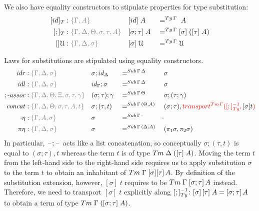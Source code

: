 \documentclass[a4paper,UKenglish,numberwithinsect,cleveref,thm-restate]{lipics-v2021}
\begin{document}
We also have equality constructors to stipulate properties for type substitution:
\begin{alignat*}{3}
  [\idS]_T & : \implicit{\Gamma, A}                               && [ \idS ] \;A         && =^{\Ty\,\Gamma}\;A \\
  [;]_T    & : \implicit{\Gamma, \Delta, \Theta, \sigma, \tau, A} && [ \sigma ; \tau ]\;A && =^{\Ty\,\Gamma} [ \sigma ]\;([ \tau ]\;A) \\
  []\UU      & : \implicit{\Gamma, \Delta, \sigma}                && [ \sigma ]\;\UU        && =^{\Ty\,\Gamma} \UU
\end{alignat*}

Laws for substitutions are stipulated using equality constructors.
\begin{alignat*}{5}
  \mathsf{idr}    & : \implicit{\Gamma, \Delta, \sigma} && {\sigma ; \idS_{\Delta}} && =^{\Sub\,\Gamma\,\Delta} && {\sigma} \\
  \mathsf{idl}    & : \implicit{\Gamma, \Delta, \sigma} && {\idS_{\Gamma} ; \sigma} && =^{\Sub\,\Gamma\,\Delta} && {\sigma} \\
  ;\text{-}\mathsf{assoc} & : \implicit{\Gamma, \Delta, \Theta, \Xi, \sigma, \tau, \gamma} && (\sigma ; \tau) ; \gamma && =^{\Sub\,\Gamma\,\Theta} &&  \sigma ; (\tau ; \gamma) \\
  \mathsf{concat} & : \implicit{\Gamma, \Delta, \Theta, \sigma, \tau, A, t} && \sigma ; (\tau , t)      && =^{\Sub\,\Gamma\,(\Theta, A)} &&  (\sigma ; \tau) , \alert{\transfib{\Tm\,\Gamma}{[;]_{\Ty}^{-1}}{\color{black}[ \sigma ] t}} \\
  \emptyctx\eta   & : \implicit{\Gamma, A, \sigma} && \sigma                   && =^{\Sub\,\Gamma\,\emptyctx} & \emptysub \\
  \pi\eta         & : \implicit{\Gamma, \Delta, \sigma} && \sigma                   && =^{\Sub\,\Gamma\,(\Delta, A)} &&  (\pi_1 \sigma, \pi_2 \sigma) \\
\end{alignat*}
In particular, $\mathord{\hspace{1pt}\text{--}\hspace{1pt}};\mathord{\hspace{1pt}\text{--}\hspace{1pt}}$ acts like a list concatenation, so conceptually $\sigma; (\tau, t)$ is equal to $(\sigma; \tau), t$ whereas the term $t$ is of type $\Tm\;\Delta\;([\tau]\;A)$. 
Moving the term $t$ from the left-hand side to the right-hand side requires us to apply substitution $\sigma$ to the term $t$ to obtain an inhabitant of $\Tm\;\Gamma\;[\sigma][\tau]\,A$.
By definition of the substitution extension, however, $[\sigma]\;t$ requires to be $\Tm\;\Gamma\;[\sigma; \tau]\,A$ instead.
Therefore, we need to transport $[\sigma]\;t$ explicitly along $[;]_{\Ty}^{-1}\colon [\sigma]\,[\tau]\;A = [\sigma;\tau]\,A$ to obtain a term of type $\Tm\;\Gamma\;([\sigma;\tau]\;A)$.
\end{document}
